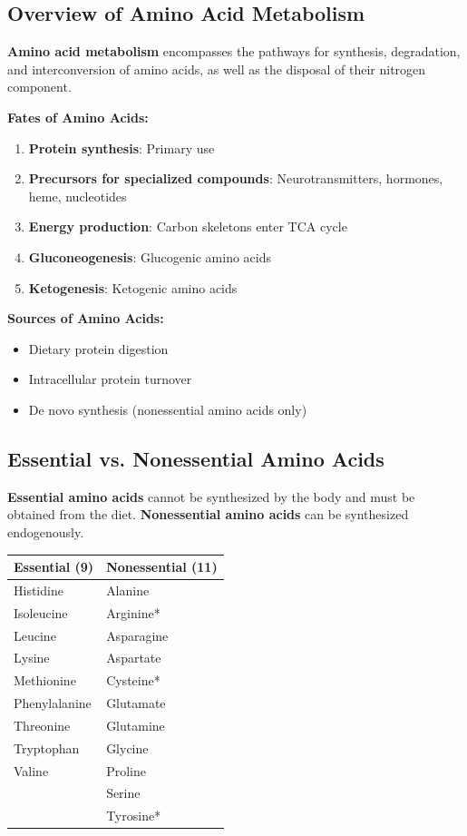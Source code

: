 \subsection{Overview of Amino Acid Metabolism}

\begin{definition}
\textbf{Amino acid metabolism} encompasses the pathways for synthesis, degradation, and interconversion of amino acids, as well as the disposal of their nitrogen component.
\end{definition}

\textbf{Fates of Amino Acids:}
\begin{enumerate}
    \item \textbf{Protein synthesis}: Primary use
    \item \textbf{Precursors for specialized compounds}: Neurotransmitters, hormones, heme, nucleotides
    \item \textbf{Energy production}: Carbon skeletons enter TCA cycle
    \item \textbf{Gluconeogenesis}: Glucogenic amino acids
    \item \textbf{Ketogenesis}: Ketogenic amino acids
\end{enumerate}

\textbf{Sources of Amino Acids:}
\begin{itemize}
    \item Dietary protein digestion
    \item Intracellular protein turnover
    \item De novo synthesis (nonessential amino acids only)
\end{itemize}

\subsection{Essential vs. Nonessential Amino Acids}

\begin{definition}
\textbf{Essential amino acids} cannot be synthesized by the body and must be obtained from the diet. \textbf{Nonessential amino acids} can be synthesized endogenously.
\end{definition}

\begin{center}
\begin{tabular}{ll}
\toprule
\textbf{Essential (9)} & \textbf{Nonessential (11)} \\
\midrule
Histidine & Alanine \\
Isoleucine & Arginine* \\
Leucine & Asparagine \\
Lysine & Aspartate \\
Methionine & Cysteine* \\
Phenylalanine & Glutamate \\
Threonine & Glutamine \\
Tryptophan & Glycine \\
Valine & Proline \\
 & Serine \\
 & Tyrosine* \\
\bottomrule
\end{tabular}
\end{center}

